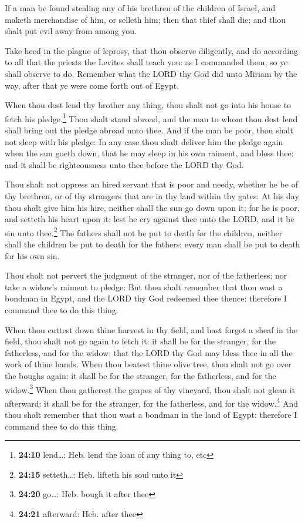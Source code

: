  If a man be found stealing any of his brethren of the
children of Israel, and maketh merchandise of him, or selleth him; then
that thief shall die; and thou shalt put evil away from among you.

 Take heed in the plague of leprosy, that thou observe
diligently, and do according to all that the priests the Levites shall
teach you: as I commanded them, so ye shall observe to do.
 Remember what the LORD thy God did unto Miriam by the
way, after that ye were come forth out of Egypt.

 When thou dost lend thy brother any thing, thou shalt
not go into his house to fetch his pledge.\footnote{\textbf{24:10}
  lend\ldots: Heb. lend the loan of any thing to, etc} 
Thou shalt stand abroad, and the man to whom thou dost lend shall bring
out the pledge abroad unto thee.  And if the man be poor,
thou shalt not sleep with his pledge:  In any case thou
shalt deliver him the pledge again when the sun goeth down, that he may
sleep in his own raiment, and bless thee: and it shall be righteousness
unto thee before the LORD thy God.

 Thou shalt not oppress an hired servant that is poor and
needy, whether he be of thy brethren, or of thy strangers that are in
thy land within thy gates:  At his day thou shalt give
him his hire, neither shall the sun go down upon it; for he is poor, and
setteth his heart upon it: lest he cry against thee unto the LORD, and
it be sin unto thee.\footnote{\textbf{24:15} setteth\ldots: Heb. lifteth
  his soul unto it}  The fathers shall not be put to
death for the children, neither shall the children be put to death for
the fathers: every man shall be put to death for his own sin.

 Thou shalt not pervert the judgment of the stranger, nor
of the fatherless; nor take a widow's raiment to pledge: 
But thou shalt remember that thou wast a bondman in Egypt, and the LORD
thy God redeemed thee thence: therefore I command thee to do this thing.

 When thou cuttest down thine harvest in thy field, and
hast forgot a sheaf in the field, thou shalt not go again to fetch it:
it shall be for the stranger, for the fatherless, and for the widow:
that the LORD thy God may bless thee in all the work of thine hands.
 When thou beatest thine olive tree, thou shalt not go
over the boughs again: it shall be for the stranger, for the fatherless,
and for the widow.\footnote{\textbf{24:20} go\ldots: Heb. bough it after
  thee}  When thou gatherest the grapes of thy vineyard,
thou shalt not glean it afterward: it shall be for the stranger, for the
fatherless, and for the widow.\footnote{\textbf{24:21} afterward: Heb.
  after thee}  And thou shalt remember that thou wast a
bondman in the land of Egypt: therefore I command thee to do this thing.

